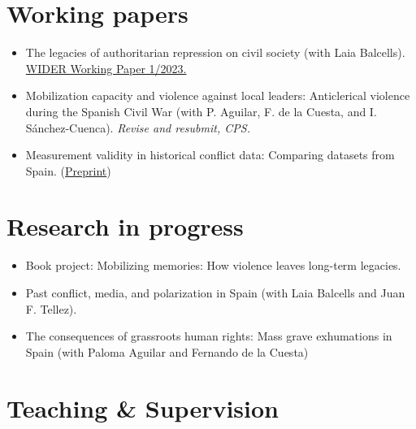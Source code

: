 \documentclass[a4paper, 12pt]{article}
\begin{document}
\section*{Working papers}

\begin{itemize}[leftmargin=*, nolistsep]
\item The legacies of authoritarian repression on civil society (with Laia Balcells).\\\href{https://doi.org/10.35188/UNU-WIDER/2023/309-3}{WIDER Working Paper 1/2023.}
\item Mobilization capacity and violence against local leaders: Anticlerical violence during the Spanish Civil War (with P. Aguilar, F. de la Cuesta, and I. Sánchez-Cuenca). \textit{Revise and resubmit, CPS.}
\item Measurement validity in historical conflict data: Comparing datasets from Spain. (\href{https://osf.io/c6wgk/}{Preprint})
\end{itemize}

\section*{Research in progress}

\begin{itemize}[leftmargin=*, nolistsep]
\item Book project: Mobilizing memories: How violence leaves long-term legacies.
\item Past conflict, media, and polarization in Spain (with Laia Balcells and Juan F. Tellez).
\item The consequences of grassroots human rights: Mass grave exhumations in Spain (with Paloma Aguilar and Fernando de la Cuesta)
\end{itemize}

\section*{Teaching \& Supervision}

\end{document}

